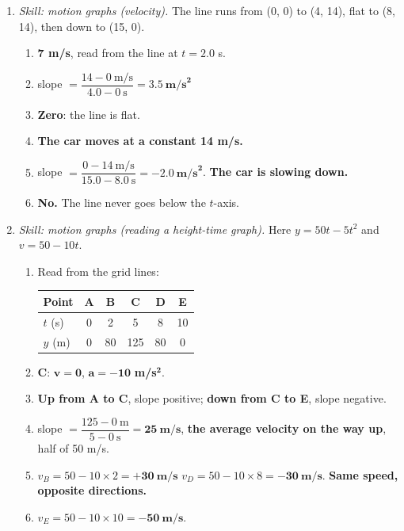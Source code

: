 \documentclass[12pt, twoside]{article}
\begin{document}
\begin{enumerate}[itemsep=0.5cm]
\item \emph{Skill: motion graphs (velocity).} The line runs from (0, 0) to (4, 14),
  flat to (8, 14), then down to (15, 0).
  \begin{enumerate}[itemsep=0.3cm]
    \item \textbf{7 m/s}, read from the line at $t = 2.0$ s.
    \item slope $= \dfrac{14 - 0~\text{m/s}}{4.0 - 0~\text{s}} =
      \mathbf{3.5~\textbf{m/s}^\mathbf{2}}$
    \item \textbf{Zero}: the line is flat.
    \item \textbf{The car moves at a constant 14 m/s.}
    \item slope $= \dfrac{0 - 14~\text{m/s}}{15.0 - 8.0~\text{s}} =
      \mathbf{-2.0~\textbf{m/s}^\mathbf{2}}$. \textbf{The car is slowing down.}
    \item \textbf{No.} The line never goes below the $t$-axis.
  \end{enumerate}

\item \emph{Skill: motion graphs (reading a height-time graph).} Here
  $y = 50t - 5t^2$ and $v = 50 - 10t$.
  \begin{enumerate}[itemsep=0.3cm]
    \item Read from the grid lines:

      {\renewcommand{\arraystretch}{1.4}%
      \begin{tabular}{| l | c | c | c | c | c |}
        \hline
        Point & A & B & C & D & E \\ \hline
        $t$ (s) & 0 & 2 & 5 & 8 & 10 \\ \hline
        $y$ (m) & 0 & 80 & 125 & 80 & 0 \\ \hline
      \end{tabular}}
    \item \textbf{C}: $\mathbf{v = 0}$, $\mathbf{a = -10}$ \textbf{m/s}$^\mathbf{2}$.
    \item \textbf{Up from A to C}, slope positive; \textbf{down from C to E}, slope
      negative.
    \item slope $= \dfrac{125 - 0~\text{m}}{5 - 0~\text{s}} =
      \mathbf{25~\textbf{m/s}}$, \textbf{the average velocity on the way up}, half
      of 50 m/s.
    \item $v_B = 50 - 10 \times 2 = \mathbf{+30~\textbf{m/s}}$ \qquad
      $v_D = 50 - 10 \times 8 = \mathbf{-30~\textbf{m/s}}$. \textbf{Same speed,
      opposite directions.}
    \item $v_E = 50 - 10 \times 10 = \mathbf{-50~\textbf{m/s}}$.
  \end{enumerate}


\end{enumerate}
\end{document}
